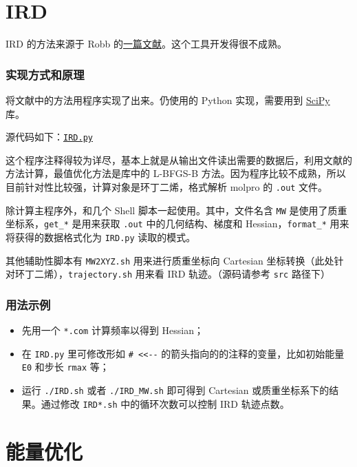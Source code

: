 \documentclass[a4paper,openany]{book}
\begin{document}
\section{IRD}

IRD 的方法来源于 Robb 的\href{http://www.sciencedirect.com/science/article/pii/000926149500821K}{一篇文献}。这个工具开发得很不成熟。

\subsubsection{实现方式和原理}

将文献中的方法用程序实现了出来。仍使用的 Python 实现，需要用到 \href{http://www.scipy.org}{SciPy} 库。

源代码如下：\href{https://github.com/GFrankenstein/UM/blob/master/pdf/src/IRD/IRD.py}{\texttt{IRD.py}}

这个程序注释得较为详尽，基本上就是从输出文件读出需要的数据后，利用文献的方法计算，最值优化方法是库中的 L-BFGS-B 方法。因为程序比较不成熟，所以目前针对性比较强，计算对象是环丁二烯，格式解析 molpro 的 \texttt{.out} 文件。

除计算主程序外，和几个 Shell 脚本一起使用。其中，文件名含 \texttt{MW} 是使用了质重坐标系，\texttt{get\_*} 是用来获取 \texttt{.out} 中的几何结构、梯度和 Hessian，\texttt{format\_*} 用来将获得的数据格式化为 \texttt{IRD.py} 读取的模式。

其他辅助性脚本有 \texttt{MW2XYZ.sh} 用来进行质重坐标向 Cartesian 坐标转换（此处针对环丁二烯），\texttt{trajectory.sh} 用来看 IRD 轨迹。（源码请参考 \texttt{src} 路径下）

\subsubsection{用法示例}

\begin{itemize}
\item
  先用一个 \texttt{*.com} 计算频率以得到 Hessian；
\item
  在 \texttt{IRD.py} 里可修改形如 \texttt{\# \textless{}\textless{}-{}-} 的箭头指向的的注释的变量，比如初始能量 \texttt{E0} 和步长 \texttt{rmax} 等；
\item
  运行 \texttt{./IRD.sh} 或者 \texttt{./IRD\_MW.sh} 即可得到 Cartesian 或质重坐标系下的结果。通过修改 \texttt{IRD*.sh} 中的循环次数可以控制 IRD 轨迹点数。
\end{itemize}

\section{能量优化}
\end{document}
